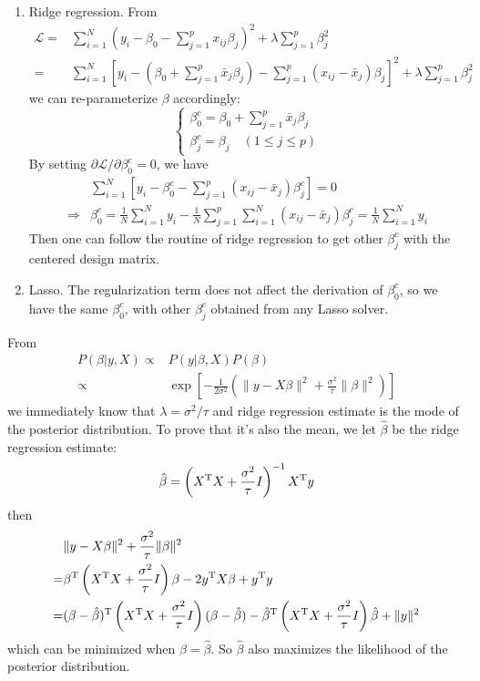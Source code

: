 \begin{sol}
\begin{enumerate}
\item Ridge regression. From
\begin{align*}
\mathcal{L} =& \sum_{i=1}^{N}\left(y_i-\beta_0-\sum_{j=1}^{p}x_{ij}\beta_j\right)^2+\lambda\sum_{j=1}^{p}\beta_j^2\\
=& \sum_{i=1}^{N}\left[y_i-\left(\beta_0+\sum_{j=1}^{p}\bar{x}_j\beta_j\right)-\sum_{j=1}^{p}\left(x_{ij}-\bar{x}_j\right)\beta_j\right]^2+\lambda\sum_{j=1}^{p}\beta_j^2
\end{align*}
we can re-parameterize $\beta$ accordingly:
\[
\begin{cases}
\beta_0^c=\beta_0+\sum_{j=1}^{p}\bar{x}_j\beta_j\\
\beta_j^c=\beta_j\quad(1\le j\le p)
\end{cases}
\]
By setting $\partial \mathcal{L}/\partial \beta^c_0=0$, we have
\begin{align*}
& \sum_{i=1}^{N}\left[y_i-\beta_0^c-\sum_{j=1}^{p}\left(x_{ij}-\bar{x}_j\right)\beta^c_j\right]=0\\
\Longrightarrow & \beta_0^c=\frac{1}{N}\sum_{i=1}^{N}y_i-\frac{1}{N}\sum_{j=1}^{p}\sum_{i=1}^{N}\left(x_{ij}-\bar{x}_j\right)\beta^c_j=\frac{1}{N}\sum_{i=1}^{N}y_i
\end{align*}
Then one can follow the routine of ridge regression to get other $\beta_j^c$ with the centered design matrix.
\item Lasso. The regularization term does not affect the derivation of $\beta_0^c$, so we have the same $\beta_0^c$, with other $\beta_j^c$ obtained from any Lasso solver.
\end{enumerate}
\end{sol}

\begin{sol}
From
\begin{align*}
P(\beta\vert y,X) \propto & P(y\vert\beta,X)P(\beta)\\
\propto& \exp\left[-\frac{1}{2\sigma^2}\left(\|y-X\beta\|^2+\frac{\sigma^2}{\tau}\|\beta\|^2\right)\right]
\end{align*}
we immediately know that $\lambda=\sigma^2/\tau$ and ridge regression estimate is the mode of the posterior distribution. To prove that it's also the mean, we let $\hat{\beta}$ be the ridge regression estimate:
\[
\hat{\beta}=\left(X^{\mathrm{T}}X+\frac{\sigma^2}{\tau}I\right)^{-1}X^{\mathrm{T}}y
\]
then
\begin{align*}
& \|y-X\beta\|^2+\frac{\sigma^2}{\tau}\|\beta\|^2 \\
=& \beta^{\mathrm{T}}\left(X^{\mathrm{T}}X+\frac{\sigma^2}{\tau}I\right)\beta - 2y^{\mathrm{T}}X\beta + y^{\mathrm{T}}y\\
=& (\beta-\hat{\beta})^{\mathrm{T}}\left(X^{\mathrm{T}}X+\frac{\sigma^2}{\tau}I\right)(\beta-\hat{\beta})-\hat{\beta}^{\mathrm{T}}\left(X^{\mathrm{T}}X+\frac{\sigma^2}{\tau}I\right)\hat{\beta}+\|y\|^2
\end{align*}
which can be minimized when $\beta=\hat{\beta}$. So $\hat{\beta}$ also maximizes the likelihood of the posterior distribution.
\end{sol}

